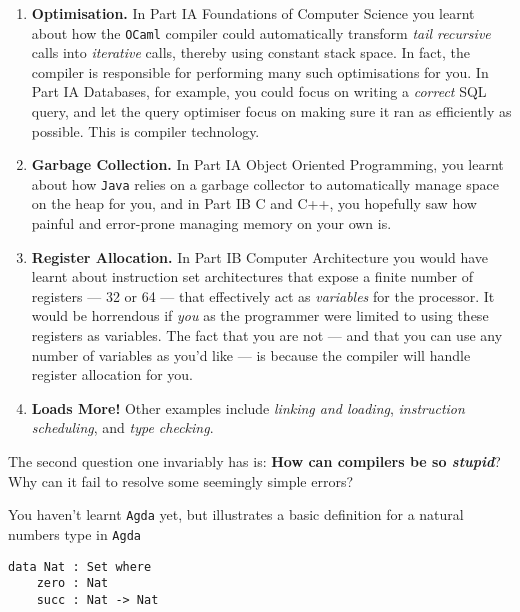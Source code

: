\begin{enumerate}
    \item \textbf{Optimisation.} In {\sffamily Part IA Foundations of Computer Science} you learnt about how the \texttt{OCaml} compiler could automatically transform \emph{tail recursive} calls into \emph{iterative} calls, thereby using constant stack space. In fact, the compiler is responsible for performing many such optimisations for you. In {\sffamily Part IA Databases}, for example, you could focus on writing a \emph{correct} SQL query, and let the query optimiser focus on making sure it ran as efficiently as possible. This is compiler technology.
    \item \textbf{Garbage Collection.} In {\sffamily Part IA Object Oriented Programming}, you learnt about how \texttt{Java} relies on a garbage collector to automatically manage space on the heap for you, and in {\sffamily Part IB C and C++}, you hopefully saw how painful and error-prone managing memory on your own is. 
    \item \textbf{Register Allocation.} In {\sffamily Part IB Computer Architecture} you would have learnt about instruction set architectures that expose a finite number of registers --- 32 or 64 --- that effectively act as \emph{variables} for the processor. It would be horrendous if \emph{you} as the programmer were limited to using these registers as variables. The fact that you are not --- and that you can use any number of variables as you'd like --- is because the compiler will handle register allocation for you.
    \item \textbf{Loads More!} Other examples include \emph{linking and loading}, \emph{instruction scheduling}, and \emph{type checking}.
\end{enumerate}

The second question one invariably has is: \textbf{How can compilers be so \emph{stupid}}? Why can it fail to resolve some seemingly simple errors?

You haven't learnt \texttt{Agda} yet, but  illustrates a basic definition for a natural numbers type in \texttt{Agda} 

\begin{code}
\label{code:agda-nat-good}
\begin{verbatim}
data Nat : Set where
    zero : Nat
    succ : Nat -> Nat
\end{verbatim}
\end{code}

